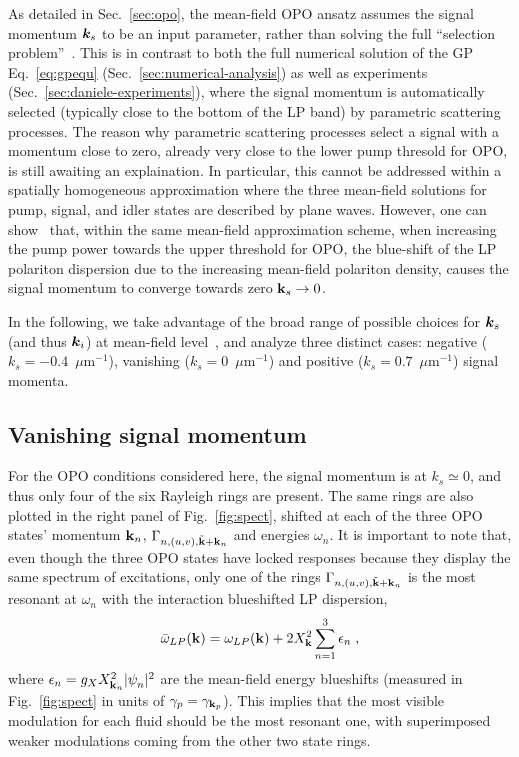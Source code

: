 As detailed in Sec.~\ref{sec:opo}, the mean-field OPO ansatz assumes
the signal momentum $\bm{k}_s$ to be an input parameter, rather than
solving the full ``selection problem''~\cite{Wouters_2007_b}. This is
in contrast to both the full numerical solution of the GP
Eq.~\eqref{eq:gpequ} (Sec.~\ref{sec:numerical-analysis}) as well as
experiments (Sec.~\ref{sec:daniele-experiments}), where the signal
momentum is automatically selected (typically close to the bottom of
the LP band) by parametric scattering processes. The reason why
parametric scattering processes select a signal with a momentum close
to zero, already very close to the lower pump thresold for OPO, is
still awaiting an explaination. In particular, this cannot be
addressed within a spatially homogeneous approximation where the three
mean-field solutions for pump, signal, and idler states are described
by plane waves. However, one can show~\cite{Whittaker_2005} that,
within the same mean-field approximation scheme, when increasing the
pump power towards the upper threshold for OPO, the blue-shift of the
LP polariton dispersion due to the increasing mean-field polariton
density, causes the signal momentum to converge towards zero
$\mathbf{k}_s \rightarrow 0$.  

In the following, we take advantage of the broad range of possible
choices for $\bm{k}_s$ (and thus $\bm{k}_i$) at mean-field
level~\cite{Wouters_2007_b}, and analyze three distinct cases:
negative ($k_s = -0.4$~$\mu$m$^{-1}$), vanishing
($k_s = 0$~$\mu$m$^{-1}$) and positive ($k_s = 0.7$~$\mu$m$^{-1}$)
signal momenta.


\subsection{Vanishing signal momentum}
\label{subsec:vanishing-signal}
%
For the OPO conditions considered here, the signal momentum is at
$k_s \simeq 0$, and thus only four of the six Rayleigh rings are
present. The same rings are also plotted in the right panel of
Fig.~\ref{fig:spect}, shifted at each of the three OPO states'
momentum $\mathbf{k}_n$, $\Gamma_{n,(u,v), \tilde{\mathbf{k}}+\mathbf{k}_n}$ and
energies $\omega_n$.
%
It is important to note that, even though the three OPO states have
locked responses because they display the same spectrum of
excitations, only one of the rings $\Gamma_{n,(u,v),
  \tilde{\mathbf{k}}+\mathbf{k}_n}$ is the most resonant at $\omega_n$
with the interaction blueshifted LP dispersion,
%
\begin{equation}
  \bar{\omega}_{LP}({\mathbf{k}}) = \omega_{LP}({\mathbf{k}}) + 2 
  X_{\mathbf{k}}^2 \sum_{n=1}^3  \epsilon_n\; ,
\label{eq:blues}
\end{equation}
%
where $\epsilon_n = g_X X_{\mathbf{k}_n}^2 |\psi_n^{}|^2$ are the
mean-field energy blueshifts (measured in Fig.~\ref{fig:spect} in
units of $\gamma_p = \gamma_{\mathbf{k}_p}$).  This implies that the
most visible modulation for each fluid should be the most resonant
one, with superimposed weaker modulations coming from the other two
state rings.

